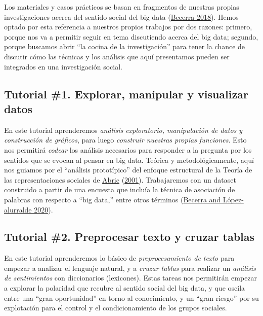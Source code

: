 \documentclass[
]{book}
\begin{document}
Los materiales y casos prácticos se basan en fragmentos de nuestras propias investigaciones acerca del sentido social del big data (\protect\hyperlink{ref-Becerra2018}{Becerra 2018}). Hemos optado por esta referencia a nuestros propios trabajos por dos razones: primero, porque nos va a permitir seguir en tema discutiendo acerca del big data; segundo, porque buscamos abrir ``la cocina de la investigación'' para tener la chance de discutir cómo las técnicas y los análisis que aquí presentamos pueden ser integrados en una investigación social.

\hypertarget{tutorial-1.-explorar-manipular-y-visualizar-datos}{%
\subsection*{Tutorial \#1. Explorar, manipular y visualizar datos}\label{tutorial-1.-explorar-manipular-y-visualizar-datos}}

En este tutorial aprenderemos \emph{análisis exploratorio, manipulación de datos y construcción de gráficos}, para luego \emph{construir nuestras propias funciones}. Esto nos permitirá \emph{codear} los análisis necesarios para responder a la pregunta por los sentidos que se evocan al pensar en big data.
Teórica y metodológicamente, aquí nos guiamos por el ``análisis prototípico'' del enfoque estructural de la Teoría de las representaciones sociales de \protect\hyperlink{ref-Abric2001}{Abric} (\protect\hyperlink{ref-Abric2001}{2001}).
Trabajaremos con un dataset construido a partir de una encuesta que incluía la técnica de asociación de palabras con respecto a ``big data,'' entre otros términos (\protect\hyperlink{ref-Becerra2020}{Becerra and López-alurralde 2020}).

\hypertarget{tutorial-2.-preprocesar-texto-y-cruzar-tablas}{%
\subsection*{Tutorial \#2. Preprocesar texto y cruzar tablas}\label{tutorial-2.-preprocesar-texto-y-cruzar-tablas}}

En este tutorial aprenderemos lo básico de \emph{preprocesamiento de texto} para empezar a analizar el lenguaje natural, y a \emph{cruzar tablas} para realizar un \emph{análisis de sentimientos} con diccionarios (lexicones).
Estas tareas nos permitirán empezar a explorar la polaridad que recubre al sentido social del big data, y que oscila entre una ``gran oportunidad'' en torno al conocimiento, y un ``gran riesgo'' por su explotación para el control y el condicionamiento de los grupos sociales.
\end{document}
